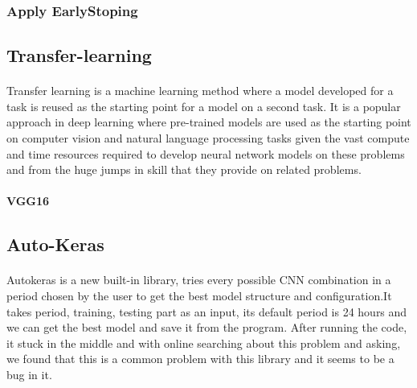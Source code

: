 \subsubsection{Apply EarlyStoping}
 
\subsection{Transfer-learning}
\paragraph{}
Transfer learning is a machine learning method where a model developed for a task is reused as the starting point for a model on a second task.
It is a popular approach in deep learning where pre-trained models are used as the starting point on computer vision and natural language processing tasks given the vast compute and time resources required to develop neural network models on these problems and from the huge jumps in skill that they provide on related problems.
\paragraph{VGG16}
\subsection{Auto-Keras}
\paragraph{}
Autokeras is a new built-in library, tries every possible CNN combination in a period chosen by the user to get the best model structure and configuration.It takes period, training, testing part as an input, its default period is 24 hours and we can get the best model and save it from the program.
After running the code, it stuck in the middle and with online searching about this problem and asking, we found that this is a common problem with this library and it seems to be a bug in it.
